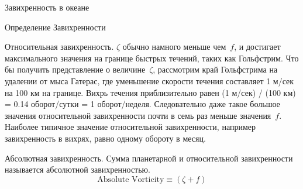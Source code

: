 \begin{chapter}{Завихренность в океане}
\begin{section}{Определение Завихренности}
\begin{paragraph}{Относительная завихренность.}
$\zeta$ обычно намного меньше чем~$f$, и достигает максимального
значения на границе быстрых течений, таких как Гольфстрим. Что бы
получить представление о величине~$\zeta$, рассмотрим край Гольфстрима на
удалении от мыса Гатерас, где уменьшение скорости течения составляет 1
м/сек на 100 км на границе. Вихрь течения приблизительно равен (1
м/сек) / (100 км) = 0.14 оборот/сутки = 1 оборот/неделя. Следовательно
даже такое большое значения относительной завихренности почти в семь
раз меньше значения~$f$. Наиболее типичное значение относительной
завихренности, например завихренность в вихрях, равно одному обороту в
месяц.
%
\end{paragraph}

\begin{paragraph}{Абсолютная завихренность.}
Сумма планетарной и относительной завихренности называется абсолютной
завихренностью.
\begin{equation}
\boxed{ \text{Absolute Vorticity} \equiv (\zeta + f) }
\end{equation}
%


\end{paragraph}
\end{section}
\end{chapter}
